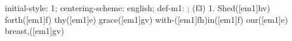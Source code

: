 initial-style: 1;
centering-scheme: english;
def-m1: \grealign;
(f3) 1. Shed([em1]hv) forth([em1]f) thy([em1]e) grace([em1]gv) with-([em1]fh)in([em1]f) our([em1]e) breast,([em1]gv)